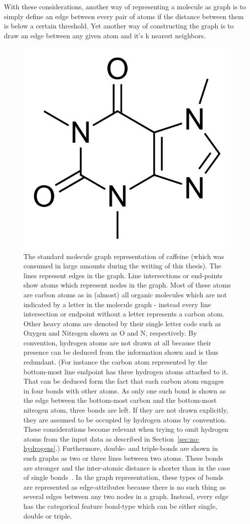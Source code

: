 With these considerations, another way of representing a molecule as graph is to simply define an edge between every pair of atoms if the distance between them is below a certain threshold. Yet another way of constructing the graph is to draw an edge between any given atom and it's k nearest neighbors.


\begin{figure}[H]
	\centering
	\includegraphics[width=0.6\linewidth]{figures/caffeine}
	\caption{The standard molecule graph representation of caffeine (which was consumed in large amounts during the writing of this thesis). The lines represent edges in the graph. Line intersections or end-points show atoms which represent nodes in the graph. Most of these atoms are carbon atoms as in (almost) all organic molecules which are not indicated by a letter in the molecule graph - instead every line intersection or endpoint without a letter represents a carbon atom. Other heavy atoms are denoted by their single letter code such as Oxygen and Nitrogen shown as O and N, respectively.
	By convention, hydrogen atoms are not drawn at all because their presence can be deduced from the information shown and is thus redundant. (For instance the carbon atom represented by the bottom-most line endpoint has three hydrogen atoms attached to it. That can be deduced form the fact that each carbon atom engages in four bonds with other atoms. As only one such bond is shown as the edge between the bottom-most carbon and the bottom-most nitrogen atom, three bonds are left. If they are not drawn explicitly, they are assumed to be occupied by hydrogen atoms by convention. These considerations become relevant when trying to omit hydrogen atoms from the input data as described in Section~\ref{sec:no-hydrogens}.)
	Furthermore, double- and triple-bonds are shown in such graphs as two or three lines between two atoms. These bonds are stronger and the inter-atomic distance is shorter than in the case of single bonds~\cite{Organic-chemistry}. In the graph representation, these types of bonds are represented as edge-attributes because there is no such thing as several edges between any two nodes in a graph. Instead, every edge has the categorical feature bond-type which can be either single, double or triple.
	}
	\label{fig:caffeine}
\end{figure}


